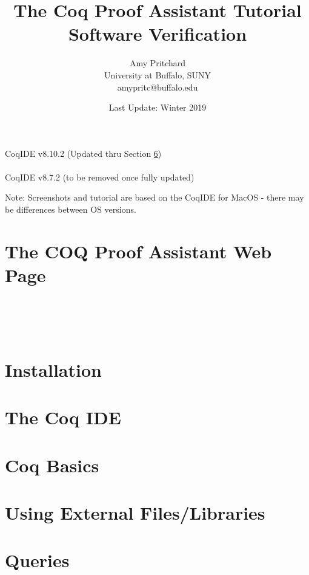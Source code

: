\documentclass{article}
\title{\textbf{The Coq Proof Assistant Tutorial} 
	\\ Software Verification}
\author{Amy Pritchard 
	\\ University at Buffalo, SUNY
	\\ amypritc@buffalo.edu}
\date{Last Update: Winter 2019}
\begin{document}
\maketitle

\begin{center}
	CoqIDE v8.10.2 (Updated thru Section \ref{Sec: queries})
\\~\\
	CoqIDE v8.7.2 (to be removed once fully updated)
\end{center}

\vfill
\noindent
{\footnotesize Note: Screenshots and tutorial are based on the CoqIDE for MacOS - there may be differences between OS versions. }

\newpage
\tableofcontents


\newpage
\section{The COQ Proof Assistant Web Page} 
	\label{Sec: webpage}
	

~\\~\\~\\
\section{Installation} 
	\label{Sec: installation}
	 


\newpage
\section{The Coq IDE} 
	\label{Sec: ide}
	


\newpage
\section{Coq Basics}
	\label{Sec: basics}
	


\newpage
\section{Using External Files/Libraries}
	\label{Sec: files}
	


\newpage
\section{Queries}
	\label{Sec: queries}
	


\newpage
\end{document}
